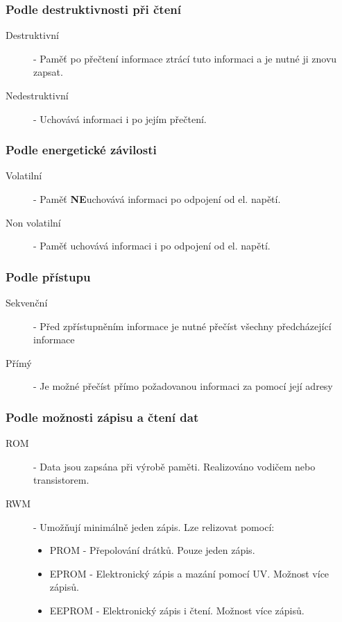 \subsubsection{Podle destruktivnosti při čtení}
\begin{description}
  \item[Destruktivní] - Paměť po přečtení informace ztrácí tuto informaci a je nutné ji znovu zapsat.
  \item[Nedestruktivní] - Uchovává informaci i po jejím přečtení.
\end{description}
\subsubsection{Podle energetické závilosti}
\begin{description}
  \item[Volatilní] - Paměť \textbf{NE}uchovává informaci po odpojení od el. napětí.
  \item[Non volatilní] - Paměť uchovává informaci i po odpojení od el. napětí.
\end{description}
\subsubsection{Podle přístupu}
\begin{description}
  \item[Sekvenční] - Před zpřístupněním informace je nutné přečíst všechny předcházející informace
  \item[Přímý] - Je možné přečíst přímo požadovanou informaci za pomocí její adresy
\end{description}
\subsubsection{Podle možnosti zápisu a čtení dat}
\begin{description}
  \item[ROM] - Data jsou zapsána při výrobě paměti. Realizováno vodičem nebo transistorem.
  \item[RWM] - Umožňují minimálně jeden zápis. Lze relizovat pomocí:
    \begin{itemize}
      \item PROM - Přepolování drátků. Pouze jeden zápis.
      \item EPROM - Elektronický zápis a mazání pomocí UV. Možnost více zápisů.
      \item EEPROM - Elektronický zápis i čtení. Možnost více zápisů.
    \end{itemize}
\end{description}
